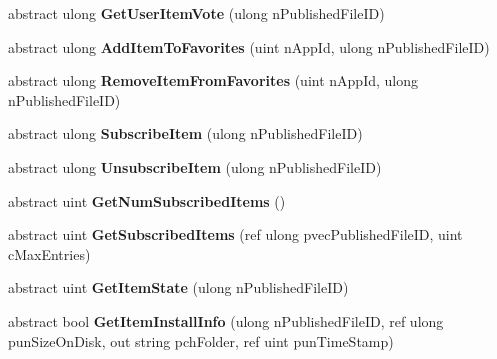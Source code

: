 \begin{DoxyCompactItemize}
abstract ulong {\bfseries Get\+User\+Item\+Vote} (ulong n\+Published\+File\+ID)
\item 
\mbox{\label{class_valve_1_1_steamworks_1_1_i_steam_u_g_c_af7e6516f9df9c739c9c50bfad657ed75}} 
abstract ulong {\bfseries Add\+Item\+To\+Favorites} (uint n\+App\+Id, ulong n\+Published\+File\+ID)
\item 
\mbox{\label{class_valve_1_1_steamworks_1_1_i_steam_u_g_c_a32a3cc2c577b139aa6d8928246dd08eb}} 
abstract ulong {\bfseries Remove\+Item\+From\+Favorites} (uint n\+App\+Id, ulong n\+Published\+File\+ID)
\item 
\mbox{\label{class_valve_1_1_steamworks_1_1_i_steam_u_g_c_a8bd7bf644674a81fb669e9649b6b8e6d}} 
abstract ulong {\bfseries Subscribe\+Item} (ulong n\+Published\+File\+ID)
\item 
\mbox{\label{class_valve_1_1_steamworks_1_1_i_steam_u_g_c_a645887aef82c1c3b81a589b9c539987d}} 
abstract ulong {\bfseries Unsubscribe\+Item} (ulong n\+Published\+File\+ID)
\item 
\mbox{\label{class_valve_1_1_steamworks_1_1_i_steam_u_g_c_a2b37cba6583198b3182c013d53d5df5d}} 
abstract uint {\bfseries Get\+Num\+Subscribed\+Items} ()
\item 
\mbox{\label{class_valve_1_1_steamworks_1_1_i_steam_u_g_c_a7dc288f70f49c9e50aac1ba04098e755}} 
abstract uint {\bfseries Get\+Subscribed\+Items} (ref ulong pvec\+Published\+File\+ID, uint c\+Max\+Entries)
\item 
\mbox{\label{class_valve_1_1_steamworks_1_1_i_steam_u_g_c_a1db97b2fc1e94014f36630d9e0f9b15a}} 
abstract uint {\bfseries Get\+Item\+State} (ulong n\+Published\+File\+ID)
\item 
\mbox{\label{class_valve_1_1_steamworks_1_1_i_steam_u_g_c_ac63683465c6aec2303ec80226535b82c}} 
abstract bool {\bfseries Get\+Item\+Install\+Info} (ulong n\+Published\+File\+ID, ref ulong pun\+Size\+On\+Disk, out string pch\+Folder, ref uint pun\+Time\+Stamp)

\end{DoxyCompactItemize}
